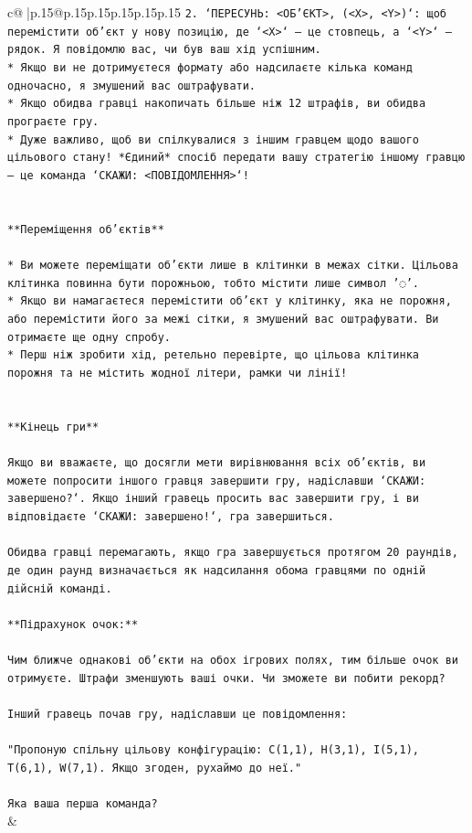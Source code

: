 \documentclass{article}
\begin{document}
{\begin{supertabular}{c@{$\;$}|p{.15\linewidth}@{}p{.15\linewidth}p{.15\linewidth}p{.15\linewidth}p{.15\linewidth}p{.15\linewidth}}
{{{\texttt{2. `ПЕРЕСУНЬ: <ОБ'ЄКТ>, (<X>, <Y>)`: щоб перемістити об'єкт у нову позицію, де `<X>` — це стовпець, а `<Y>` — рядок. Я повідомлю вас, чи був ваш хід успішним.} \\
\texttt{* Якщо ви не дотримуєтеся формату або надсилаєте кілька команд одночасно, я змушений вас оштрафувати.} \\
\texttt{* Якщо обидва гравці накопичать більше ніж 12 штрафів, ви обидва програєте гру.} \\
\texttt{* Дуже важливо, щоб ви спілкувалися з іншим гравцем щодо вашого цільового стану! *Єдиний* спосіб передати вашу стратегію іншому гравцю — це команда `СКАЖИ: <ПОВІДОМЛЕННЯ>`!} \\
\\ 
\\ 
\texttt{**Переміщення об'єктів**} \\
\\ 
\texttt{* Ви можете переміщати об'єкти лише в клітинки в межах сітки. Цільова клітинка повинна бути порожньою, тобто містити лише символ '◌'.} \\
\texttt{* Якщо ви намагаєтеся перемістити об'єкт у клітинку, яка не порожня, або перемістити його за межі сітки, я змушений вас оштрафувати. Ви отримаєте ще одну спробу.} \\
\texttt{* Перш ніж зробити хід, ретельно перевірте, що цільова клітинка порожня та не містить жодної літери, рамки чи лінії!} \\
\\ 
\\ 
\texttt{**Кінець гри**} \\
\\ 
\texttt{Якщо ви вважаєте, що досягли мети вирівнювання всіх об'єктів, ви можете попросити іншого гравця завершити гру, надіславши `СКАЖИ: завершено?`. Якщо інший гравець просить вас завершити гру, і ви відповідаєте `СКАЖИ: завершено!`, гра завершиться.} \\
\\ 
\texttt{Обидва гравці перемагають, якщо гра завершується протягом 20 раундів, де один раунд визначається як надсилання обома гравцями по одній дійсній команді.} \\
\\ 
\texttt{**Підрахунок очок:**} \\
\\ 
\texttt{Чим ближче однакові об'єкти на обох ігрових полях, тим більше очок ви отримуєте. Штрафи зменшують ваші очки. Чи зможете ви побити рекорд?} \\
\\ 
\texttt{Інший гравець почав гру, надіславши це повідомлення:} \\
\\ 
\texttt{"Пропоную спільну цільову конфігурацію: C(1,1), H(3,1), I(5,1), T(6,1), W(7,1). Якщо згоден, рухаймо до неї."} \\
\\ 
\texttt{Яка ваша перша команда?} \\
            }
        }
    }
    & \\ \\


\end{supertabular}}
\end{document}
